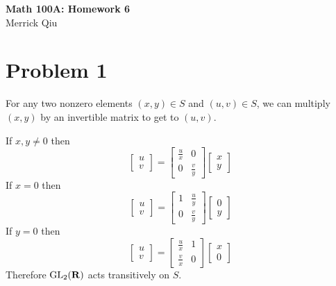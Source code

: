 \documentclass{article}
\begin{document}
\begin{center}
	\huge{\bf Math 100A: Homework 6} \\
	Merrick Qiu
\end{center}

\section*{Problem 1}
For any two nonzero elements $(x,y) \in S$ and $(u,v) \in S$,
we can multiply $(x,y)$ by an invertible matrix to get to $(u,v)$.

If $x, y \neq 0$ then
\[
	\begin{bmatrix}
		u \\ v
	\end{bmatrix} = 
	\begin{bmatrix}
		\frac{u}{x} & 0 \\
		0 & \frac{v}{y}
	\end{bmatrix}
	\begin{bmatrix}
		x \\ y
	\end{bmatrix}
\]
If $x = 0$ then
\[
	\begin{bmatrix}
		u \\ v
	\end{bmatrix} = 
	\begin{bmatrix}
		1 & \frac{u}{y} \\
		0 & \frac{v}{y}
	\end{bmatrix}
	\begin{bmatrix}
		0 \\ y
	\end{bmatrix}
\]
If $y = 0$ then 
\[
	\begin{bmatrix}
		u \\ v
	\end{bmatrix} = 
	\begin{bmatrix}
		\frac{u}{x} & 1\\
		\frac{v}{x} & 0
	\end{bmatrix}
	\begin{bmatrix}
		x \\ 0
	\end{bmatrix}
\]
Therefore $\text{GL}_2(\bf{R})$ acts transitively on $S$.
\newpage 
\end{document}
